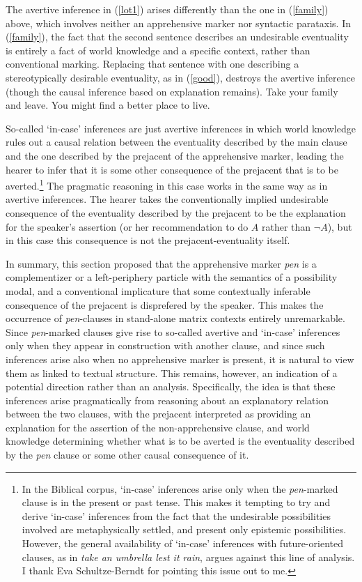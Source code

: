 \documentclass[output=paper,colorlinks,citecolor=brown]{langscibook}
\begin{document}
The avertive inference in (\ref{lot1}) arises differently than the one in (\ref{family}) above, which involves neither an apprehensive marker nor syntactic parataxis. In (\ref{family}), the fact that the second sentence describes an undesirable eventuality is entirely a fact of world knowledge and a specific context, rather than conventional marking. Replacing that sentence with one describing a stereotypically desirable eventuality, as in (\ref{good}), destroys the avertive inference (though the causal inference based on explanation remains). 
\ea
\label{good}
Take your family and leave. You might find a better place to live. 
\z


So-called `in-case' inferences are just avertive inferences in which world knowledge rules out a causal relation between the eventuality described by the main clause and the one described by the prejacent of the apprehensive marker, leading the hearer to infer that it is some other consequence of the prejacent that is to be averted.\footnote{In the Biblical corpus, `in-case' inferences arise only when the \textit{pen}-marked clause is in the present or past tense. This makes it tempting to try and derive `in-case' inferences from the fact that the undesirable possibilities involved are metaphysically settled, and present only epistemic possibilities. However, the general availability of `in-case' inferences with future-oriented clauses, as in \textit{take an umbrella lest it rain}, argues against this line of analysis. I thank Eva Schultze-Berndt for pointing this issue out to me.} The pragmatic reasoning in this case works in the same way as in avertive inferences. The hearer takes the conventionally implied undesirable consequence of the eventuality described by the prejacent to be the explanation for the speaker's assertion (or her recommendation to do $A$ rather than $\neg A$), but in this case this consequence is not the prejacent-eventuality itself. 

In summary, this section proposed that the  apprehensive marker \textit{pen} is a complementizer or a left-periphery particle with the semantics of a possibility modal, and a conventional implicature that some contextually inferable consequence of the prejacent is disprefered by the speaker. This makes the occurrence of \textit{pen}-clauses in stand-alone matrix contexts entirely unremarkable. Since \textit{pen}-marked clauses give rise to so-called avertive and `in-case' inferences only when they appear in construction with another clause, and since such inferences arise also when no apprehensive marker is present, it is natural to view them as linked to textual structure. This remains, however, an indication of a potential direction rather than an analysis. Specifically, the idea is that these inferences arise pragmatically from reasoning about an explanatory relation between the two clauses, with the prejacent interpreted as providing an explanation for the assertion of the non-apprehensive clause, and world knowledge determining whether what is to be averted is the eventuality described by the \textit{pen} clause or some other causal consequence of it. 
\end{document}
